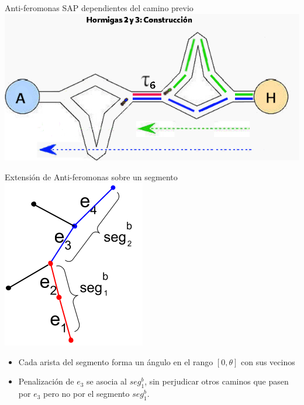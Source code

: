 \begin{frame}{Anti-feromonas SAP dependientes del camino previo}
    \includegraphics[scale=0.5]{Pictures/ACO-ant-ferom-penalize-seg.png}
\end{frame}


\begin{frame}{Extensi\'on de Anti-feromonas sobre un segmento}
\centering
\includegraphics[scale=0.4]{Pictures/ant_segments_simple_case.png}
    \begin{itemize}
        \item Cada arista del segmento forma un \'angulo en el rango $[0, \theta]$ con sus vecinos
        \item Penalizaci\'on de $e_3$ se asocia al $seg^{b}_{1}$, sin perjudicar otros caminos que pasen por $e_3$ pero no por el segmento $seg^{b}_{1}$.
    \end{itemize}
\end{frame}

